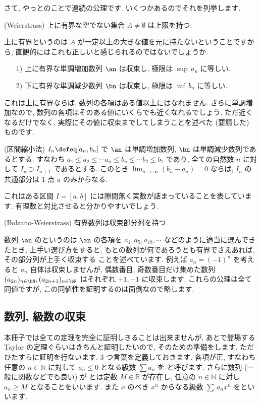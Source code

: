 \documentclass[openany, a4paper, oneside]{jsbook}
\begin{document}
さて, やっとのことで連続の公理です. いくつかあるのでそれを列挙します.
\begin{axm}(Weierstrass)
上に有界な空でない集合 $A\not=\emptyset$ は上限を持つ.
\end{axm}
上に有界というのは $A$ が一定以上の大きな値を元に持たないということですから,
直観的にはこれも正しいと感じられるのではないでしょうか.
\begin{axm}
\begin{enumerate}
\item[1)] 上に有界な単調増加数列 $\an$ は収束し, 極限は $\sup \, a_n$ に等しい.
\item[2)] 下に有界な単調減少数列 $\bn$ は収束し, 極限は $\inf \, b_n$ に等しい.
\end{enumerate}
\end{axm}
これは上に有界ならば, 数列の各項はある値以上にはなれません.
さらに単調増加なので, 数列の各項はそのある値にいくらでも近くなれるでしょう.
ただ近くなるだけでなく, 実際にその値に収束までしてしまうことを述べた (要請した) ものです.
\begin{axm}(区間縮小法)
 $I_n\defeq[a_n,b_n]$ で $\an$ は単調増加数列,  $\bn$ は単調減少数列であるとする.
すなわち $a_1\leq a_2\leq \dotsb a_n \leq b_n \leq \dotsb b_2\leq b_1$ であり,
全ての自然数 $n$ に対して $I_n \supset I_{n+1}$ であるとする.
このとき $\displaystyle \lim_{n\to\infty}(b_n - a_n)=0$ ならば,  $I_n$ の共通部分は
1 点 $a$ のみからなる.
\end{axm}
これはある区間 $I=[a,b]$ には隙間無く実数が詰まっていることを表しています.
有理数と対比させると分かりやすいでしょう.
\begin{axm}(Bolzano-Weierstrass)
有界数列は収束部分列を持つ.
\end{axm}
数列 $\an$ のというのは $\an$ の各項を $a_1,a_5,a_78,\dotsb$ などのように適当に選んできたとき,
上手い選び方をすると, もとの数列が何であろうとも有界でさえあれば, その部分列が上手く収束する
ことを述べています. 例えば $a_n=(-1)^{n}$ を考えると $a_n$ 自体は収束しませんが,
偶数番目, 奇数番目だけ集めた数列 $(a_{2n})_{n\in\bN},(a_{2n+1})_{n\in\bN}$ はそれぞれ $+1,-1$ に収束します.
これらの公理は全て同値ですが, この同値性を証明するのは面倒なので略します.
\subsection{数列, 級数の収束}

本冊子では全ての定理を完全に証明しきることは出来ませんが,
あとで登場する Taylor の定理ぐらいはきちんと証明したいので, そのための準備をします.
ただひたすらに証明を行ないます.
3 つ言葉を定義しておきます. 各項が正, すなわち任意の
 $n \in \mathbb{N}$ に対して $a_n \leq 0$ となる級数 $\sum a_n$ を
と呼びます. さらに数列 (一般に関数などでも良い) が
とは定数 $M \in \mathbb{R}$ が存在し,
任意の $n \in \mathbb{N}$ に対し $a_n \geq M$ となることをいいます.
また $x$ のべき $x^n$ からなる級数 $\sum \, a_n x^n$ をといいます.
\end{document}
